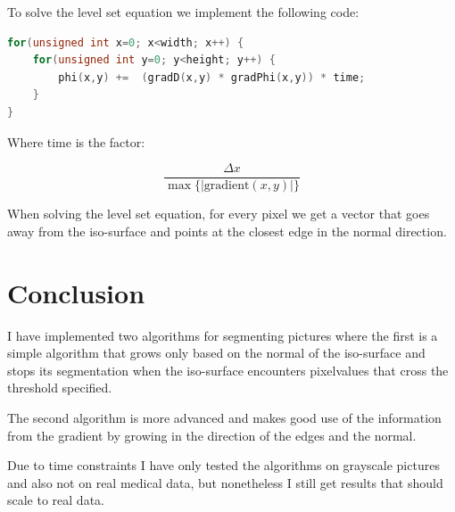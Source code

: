 To solve the level set equation we implement the following code:
\begin{lstlisting}[language=c++]
for(unsigned int x=0; x<width; x++) {
    for(unsigned int y=0; y<height; y++) {
        phi(x,y) +=  (gradD(x,y) * gradPhi(x,y)) * time;
    }
}
\end{lstlisting}

Where time is the factor:

\begin{equation*}
  \dfrac{\Delta x} {\max \{|\textrm{gradient}(x,y)|\}} 
\end{equation*}

When solving the level set equation, for every pixel we get a vector
that goes away from the iso-surface and points at the closest edge in
the normal direction.

\pagebreak

\section{Conclusion}
\label{segmentation:conclusion}

I have implemented two algorithms for segmenting pictures where the
first is a simple algorithm that grows only based on the normal of the
iso-surface and stops its segmentation when the iso-surface encounters
pixelvalues that cross the threshold specified.

The second algorithm is more advanced and makes good use of the
information from the gradient by growing in the direction of the edges
and the normal.

Due to time constraints I have only tested the algorithms on grayscale
pictures and also not on real medical data, but nonetheless I still
get results that should scale to real data.

